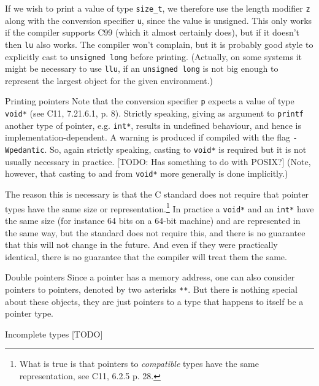 \documentclass[article, a4paper, 11pt, oneside]{memoir}
\numberwithin{equation}{chapter}
\newcommand{\inlinecode}[1]{\colorbox{lightgray}{\vphantom{\texttt{jk}}\lstinline$#1$}}
\renewcommand{\inlinecode}{\lstinline}
\begin{document}
\begin{notelist}
If we wish to print a value of type \inlinecode{size_t}, we therefore use the length modifier \inlinecode{z} along with the conversion specifier \inlinecode{u}, since the value is unsigned. This only works if the compiler supports C99 (which it almost certainly does), but if it doesn't then \inlinecode{lu} also works. The compiler won't complain, but it is probably good style to explicitly cast to \inlinecode{unsigned long} before printing. (Actually, on some systems it might be necessary to use \inlinecode{llu}, if an \inlinecode{unsigned long} is not big enough to represent the largest object for the given environment.)

\item[Printing pointers]
Note that the conversion specifier \inlinecode{p} expects a value of type \inlinecode{void*} (see C11, 7.21.6.1, p. 8). Strictly speaking, giving as argument to \inlinecode{printf} another type of pointer, e.g. \inlinecode{int*}, results in undefined behaviour, and hence is implementation-dependent. A warning is produced if compiled with the flag \inlinecode{-Wpedantic}. So, again strictly speaking, casting to \inlinecode{void*} is required but it is not usually necessary in practice. [TODO: Has something to do with POSIX?] (Note, however, that casting to and from \inlinecode{void*} more generally is done implicitly.)

The reason this is necessary is that the C standard does not require that pointer types have the same size or representation.\footnote{What is true is that pointers to \emph{compatible} types have the same representation, see C11, 6.2.5 p. 28.} In practice a \inlinecode{void*} and an \inlinecode{int*} have the same size (for instance 64 bits on a 64-bit machine) and are represented in the same way, but the standard does not require this, and there is no guarantee that this will not change in the future. And even if they were practically identical, there is no guarantee that the compiler will treat them the same.

\item[Double pointers]
Since a pointer has a memory address, one can also consider pointers to pointers, denoted by two asterisks \inlinecode{**}. But there is nothing special about these objects, they are just pointers to a type that happens to itself be a pointer type.

\item[Incomplete types] [TODO]


\end{notelist}
\end{document}
